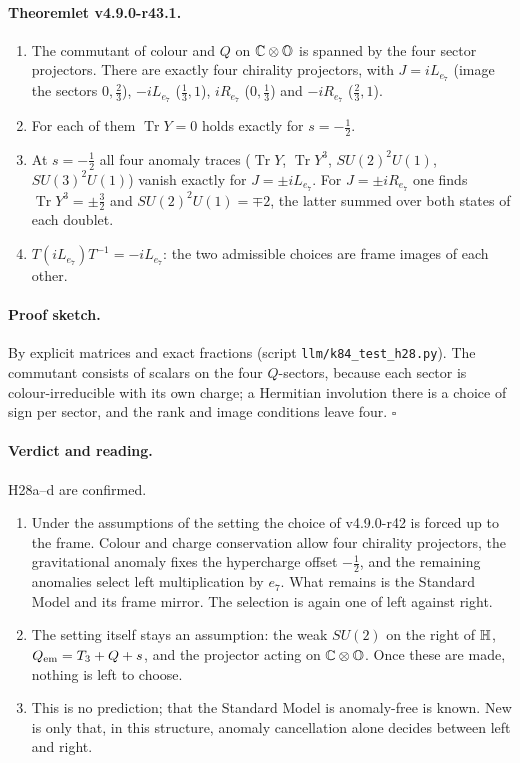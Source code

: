 \paragraph{Theoremlet v4.9.0-r43.1.}
\begin{enumerate}[leftmargin=2em]
\item[(a)] The commutant of colour and \(Q\) on \(\mathbb C\otimes\mathbb{O}\) is spanned by the four sector projectors.  There are exactly four chirality
projectors, with \(J=iL_{e_7}\) (image the sectors \(0,\tfrac23\)), \(-iL_{e_7}\) (\(\tfrac13,1\)), \(iR_{e_7}\) (\(0,\tfrac13\)) and \(-iR_{e_7}\)
(\(\tfrac23,1\)).
\item[(b)] For each of them \(\operatorname{Tr}Y=0\) holds exactly for \(s=-\tfrac12\).
\item[(c)] At \(s=-\tfrac12\) all four anomaly traces (\(\operatorname{Tr}Y\), \(\operatorname{Tr}Y^3\), \(SU(2)^2U(1)\), \(SU(3)^2U(1)\)) vanish
exactly for \(J=\pm iL_{e_7}\).  For \(J=\pm iR_{e_7}\) one finds \(\operatorname{Tr}Y^3=\pm\tfrac32\) and \(SU(2)^2U(1)=\mp2\), the latter
summed over both states of each doublet.
\item[(d)] \(T(iL_{e_7})T^{-1}=-iL_{e_7}\): the two admissible choices are frame images of each other.
\end{enumerate}

\paragraph{Proof sketch.}
By explicit matrices and exact fractions (script \texttt{llm/k84\_test\_h28.py}).  The commutant consists of scalars on the four \(Q\)-sectors,
because each sector is colour-irreducible with its own charge; a Hermitian involution there is a choice of sign per sector, and the rank and
image conditions leave four.  \(\square\)

\paragraph{Verdict and reading.}
H28a--d are confirmed.
\begin{enumerate}[leftmargin=2em]
\item Under the assumptions of the setting the choice of v4.9.0-r42 is forced up to the frame.  Colour and charge conservation allow
four chirality projectors, the gravitational anomaly fixes the hypercharge offset \(-\tfrac12\), and the remaining anomalies select left
multiplication by \(e_7\).  What remains is the Standard Model and its frame mirror.  The selection is again one of left against right.
\item The setting itself stays an assumption: the weak \(SU(2)\) on the right of \(\mathbb{H}\), \(Q_{\rm em}=T_3+Q+s\), and the projector acting on
\(\mathbb C\otimes\mathbb{O}\).  Once these are made, nothing is left to choose.
\item This is no prediction; that the Standard Model is anomaly-free is known.  New is only that, in this structure, anomaly cancellation
alone decides between left and right.
\end{enumerate}

